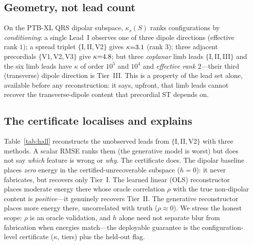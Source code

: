 \subsection{Geometry, not lead count}
On the PTB-XL QRS dipolar subspace, $\kappa_s(S)$ ranks configurations by
\emph{conditioning}: a single Lead~I observes one of three dipole directions
(effective rank $1$); a spread triplet $\{$I,\,II,\,V2$\}$ gives $\kappa{=}3.1$
(rank $3$); three adjacent precordials $\{$V1,\,V2,\,V3$\}$ give $\kappa{=}4.8$;
but three \emph{coplanar} limb leads $\{$I,\,II,\,III$\}$ and the six limb leads have
$\kappa$ of order $10^{5}$ and $10^{4}$ and \emph{effective rank $2$}---their third
(transverse) dipole direction is Tier~III. This is a property of the lead set alone,
available before any reconstruction: it says, upfront, that limb leads cannot recover
the transverse-dipole content that precordial ST depends on.

\subsection{The certificate localises and explains}
Table~\ref{tab:hall} reconstructs the unobserved leads from $\{$I,\,II,\,V2$\}$ with
three methods. A scalar RMSE ranks them (the generative model is worst) but does not
say \emph{which} feature is wrong or \emph{why}. The certificate does. The dipolar
baseline places \emph{zero} energy in the certified-unrecoverable subspace ($h{=}0$):
it never fabricates, but recovers only Tier~I. The learned linear (OLS) reconstructor
places moderate energy there whose oracle correlation $\rho$ with the true non-dipolar
content is \emph{positive}---it genuinely recovers Tier~II. The generative
reconstructor places more energy there, uncorrelated with truth ($\rho\!\approx\!0$).
We stress the honest scope: $\rho$ is an oracle validation, and $h$ alone need not
separate blur from fabrication when energies match---the deployable guarantee is the
configuration-level certificate ($\kappa$, tiers) plus the held-out flag.

